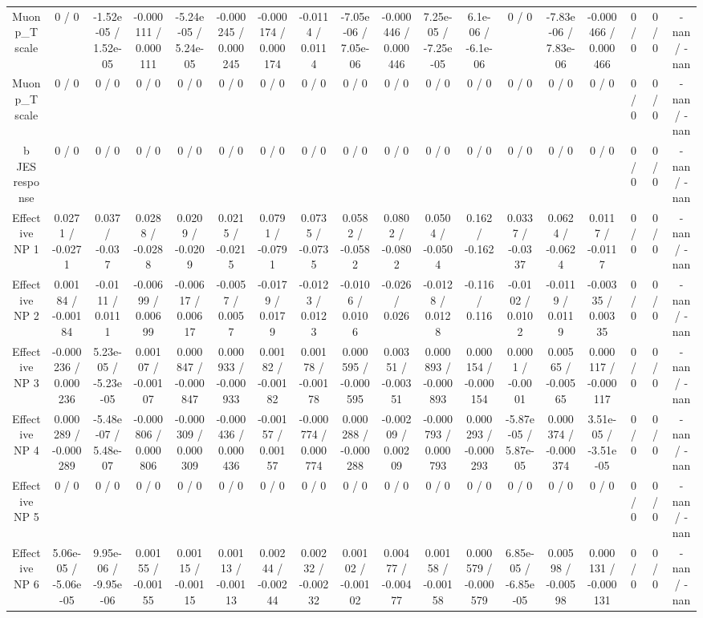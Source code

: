 \documentclass[10pt]{article}
\begin{document}
\begin{table}[htbp]
\begin{center}
\begin{tabular}{|c|c|c|c|c|c|c|c|c|c|c|c|c|c|c|c|c|c|}
  Muon p_{T} scale & 0 / 0 & -1.52e-05 / 1.52e-05 & -0.000111 / 0.000111 & -5.24e-05 / 5.24e-05 & -0.000245 / 0.000245 & -0.000174 / 0.000174 & -0.0114 / 0.0114 & -7.05e-06 / 7.05e-06 & -0.000446 / 0.000446 & 7.25e-05 / -7.25e-05 & 6.1e-06 / -6.1e-06 & 0 / 0 & -7.83e-06 / 7.83e-06 & -0.000466 / 0.000466 & 0 / 0 & 0 / 0 & -nan / -nan \\ 
  Muon p_{T} scale & 0 / 0 & 0 / 0 & 0 / 0 & 0 / 0 & 0 / 0 & 0 / 0 & 0 / 0 & 0 / 0 & 0 / 0 & 0 / 0 & 0 / 0 & 0 / 0 & 0 / 0 & 0 / 0 & 0 / 0 & 0 / 0 & -nan / -nan \\ 
  b JES response & 0 / 0 & 0 / 0 & 0 / 0 & 0 / 0 & 0 / 0 & 0 / 0 & 0 / 0 & 0 / 0 & 0 / 0 & 0 / 0 & 0 / 0 & 0 / 0 & 0 / 0 & 0 / 0 & 0 / 0 & 0 / 0 & -nan / -nan \\ 
  Effective NP 1 & 0.0271 / -0.0271 & 0.037 / -0.037 & 0.0288 / -0.0288 & 0.0209 / -0.0209 & 0.0215 / -0.0215 & 0.0791 / -0.0791 & 0.0735 / -0.0735 & 0.0582 / -0.0582 & 0.0802 / -0.0802 & 0.0504 / -0.0504 & 0.162 / -0.162 & 0.0337 / -0.0337 & 0.0624 / -0.0624 & 0.0117 / -0.0117 & 0 / 0 & 0 / 0 & -nan / -nan \\ 
  Effective NP 2 & 0.00184 / -0.00184 & -0.0111 / 0.0111 & -0.00699 / 0.00699 & -0.00617 / 0.00617 & -0.0057 / 0.0057 & -0.0179 / 0.0179 & -0.0123 / 0.0123 & -0.0106 / 0.0106 & -0.026 / 0.026 & -0.0128 / 0.0128 & -0.116 / 0.116 & -0.0102 / 0.0102 & -0.0119 / 0.0119 & -0.00335 / 0.00335 & 0 / 0 & 0 / 0 & -nan / -nan \\ 
  Effective NP 3 & -0.000236 / 0.000236 & 5.23e-05 / -5.23e-05 & 0.00107 / -0.00107 & 0.000847 / -0.000847 & 0.000933 / -0.000933 & 0.00182 / -0.00182 & 0.00178 / -0.00178 & 0.000595 / -0.000595 & 0.00351 / -0.00351 & 0.000893 / -0.000893 & 0.000154 / -0.000154 & 0.0001 / -0.0001 & 0.00565 / -0.00565 & 0.000117 / -0.000117 & 0 / 0 & 0 / 0 & -nan / -nan \\ 
  Effective NP 4 & 0.000289 / -0.000289 & -5.48e-07 / 5.48e-07 & -0.000806 / 0.000806 & -0.000309 / 0.000309 & -0.000436 / 0.000436 & -0.00157 / 0.00157 & -0.000774 / 0.000774 & 0.000288 / -0.000288 & -0.00209 / 0.00209 & -0.000793 / 0.000793 & 0.000293 / -0.000293 & -5.87e-05 / 5.87e-05 & 0.000374 / -0.000374 & 3.51e-05 / -3.51e-05 & 0 / 0 & 0 / 0 & -nan / -nan \\ 
  Effective NP 5 & 0 / 0 & 0 / 0 & 0 / 0 & 0 / 0 & 0 / 0 & 0 / 0 & 0 / 0 & 0 / 0 & 0 / 0 & 0 / 0 & 0 / 0 & 0 / 0 & 0 / 0 & 0 / 0 & 0 / 0 & 0 / 0 & -nan / -nan \\ 
  Effective NP 6 & 5.06e-05 / -5.06e-05 & 9.95e-06 / -9.95e-06 & 0.00155 / -0.00155 & 0.00115 / -0.00115 & 0.00113 / -0.00113 & 0.00244 / -0.00244 & 0.00232 / -0.00232 & 0.00102 / -0.00102 & 0.00477 / -0.00477 & 0.00158 / -0.00158 & 0.000579 / -0.000579 & 6.85e-05 / -6.85e-05 & 0.00598 / -0.00598 & 0.000131 / -0.000131 & 0 / 0 & 0 / 0 & -nan / -nan \\ 

\end{tabular}
\end{center}
\end{table}
\end{document}
